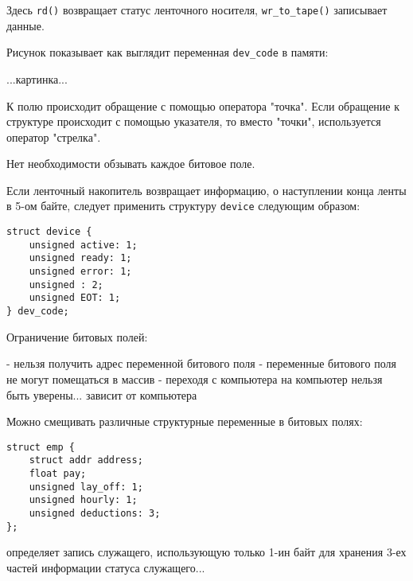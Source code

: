 Здесь \texttt{rd()} возвращает статус ленточного носителя, \texttt{wr\_to\_tape()} записывает данные.

Рисунок показывает как выглядит переменная \texttt{dev\_code} в памяти:

...картинка...

К полю происходит обращение с помощью оператора "точка". Если обращение к структуре происходит с помощью указателя, то вместо "точки", используется оператор "стрелка".

Нет необходимости обзывать каждое битовое поле.

Если ленточный накопитель возвращает информацию, о наступлении конца ленты в 5-ом байте, следует применить структуру \texttt{device} следующим образом:

\begin{verbatim}
struct device {
    unsigned active: 1;
    unsigned ready: 1;
    unsigned error: 1;
    unsigned : 2;
    unsigned EOT: 1;
} dev_code;
\end{verbatim}

Ограничение битовых полей:

- нельзя получить адрес переменной битового поля
- переменные битового поля не могут помещаться в массив
- переходя с компьютера на компьютер нельзя быть уверены... зависит от компьютера

Можно смещивать различные структурные переменные в битовых полях:

\begin{verbatim}
struct emp {
    struct addr address;
    float pay;
    unsigned lay_off: 1;
    unsigned hourly: 1;
    unsigned deductions: 3;
};
\end{verbatim}

определяет запись служащего, использующую только 1-ин байт для хранения 3-ех частей информации статуса служащего...